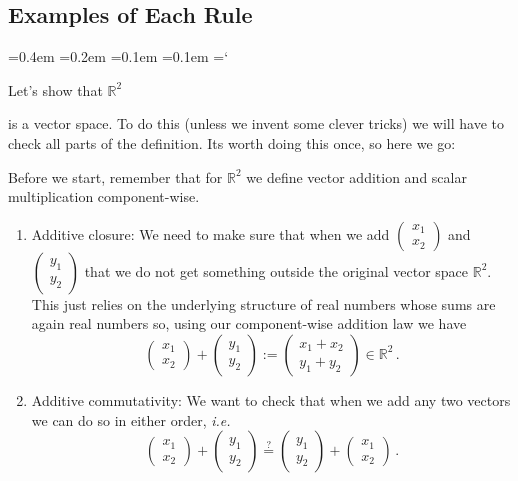 
\subsection*{Examples of Each Rule}

{\ttfamily
{}\font=0.4em
\font=0.2em
\font=0.1em
\font=0.1em
\hyphenchar\font=`\-


\hypertarget{scripts_vector_spaces_definition_example}{Let's show that ${\mathbb R}^2$} is a vector space.
To do this (unless we invent some clever tricks) we will have to check all parts of the definition. Its worth doing this once, so here we go:

Before we start, remember that for ${\mathbb R}^2$ we define
vector addition and scalar multiplication component-wise.

\begin{enumerate}
\item[(+i)] Additive closure: We need to make sure that
when we add $\begin{pmatrix}x_1\\x_2\end{pmatrix}$
and $\begin{pmatrix}y_1\\y_2\end{pmatrix}$ that we do not 
get something outside the original vector space ${\mathbb R}^2$. This just relies on the underlying structure of real numbers whose sums are again real numbers so, using our component-wise addition law we have
\[
\begin{pmatrix}x_1\\x_2\end{pmatrix}+
\begin{pmatrix}y_1\\y_2\end{pmatrix}
:=
\begin{pmatrix}x_1+x_2\\y_1+y_2\end{pmatrix}\in {\mathbb R}^2\, .
\]
\item[(+ii)] Additive commutativity: We want to check that when we add any two vectors we can do so in either order, {\itshape i.e.} 
\[
\begin{pmatrix}x_1\\x_2\end{pmatrix}+
\begin{pmatrix}y_1\\y_2\end{pmatrix}
\stackrel?=
\begin{pmatrix}y_1\\y_2\end{pmatrix}+
\begin{pmatrix}x_1\\x_2\end{pmatrix}\, .\]


\end{enumerate}}
